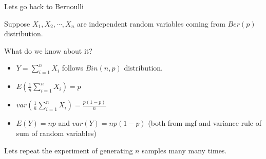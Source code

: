 \documentclass{beamer}\usepackage[]{graphicx}\usepackage[]{color}
\begin{document}
% 

\begin{frame}{Lets go back to Bernoulli}

Suppose $X_1, X_2, \cdots, X_n$ are independent random variables coming from $Ber(p)$ distribution. \pause \newline

What do we know about it? \pause \newline

\begin{itemize}
\item $Y = \sum_{i=1}^{n} X_{i}$ follows $Bin(n,p)$ distribution. \pause
\item $E \left (\frac{1}{n} \sum_{i=1}^{n} X_{i} \right ) = p $ \pause
\item $ var \left (\frac{1}{n} \sum_{i=1}^{n} X_{i} \right ) = \frac{p(1-p)}{n} $ \pause
\item $ E(Y) = np$ and $var(Y) = np(1-p)$ (both from mgf and variance rule of sum of random variables) \pause
\end{itemize}

Lets repeat the experiment of generating $n$ samples many many times.

\end{frame}
\end{document}
